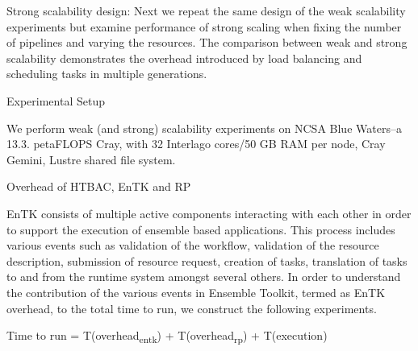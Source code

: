 
Strong scalability design: Next we repeat the same design of the weak scalability experiments but examine performance of strong scaling when fixing the number of pipelines and varying the resources. The comparison between weak and strong scalability demonstrates the overhead introduced by load balancing and scheduling tasks in multiple generations.


Experimental Setup

We perform weak (and strong) scalability experiments on NCSA Blue Waters--a 13.3. petaFLOPS Cray, with 32 Interlago cores/50 GB RAM per node, Cray Gemini, Lustre shared file system.

Overhead of HTBAC, EnTK and RP

EnTK consists of multiple active components interacting with each other in order to support the execution of ensemble based applications. This process includes various events such as validation of the workflow, validation of the resource description, submission of resource request, creation of tasks, translation of tasks to and from the runtime system amongst several others. In order to understand the contribution of the various events in Ensemble Toolkit, termed as EnTK overhead, to the total time to run, we construct the following experiments.

Time to run = T(overhead\textsubscript{entk}) + T(overhead\textsubscript{rp}) + T(execution)
